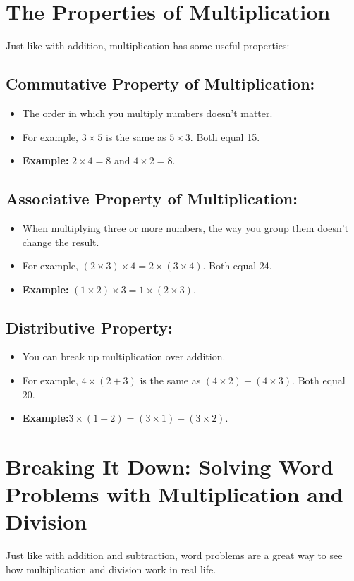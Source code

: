 \section{The Properties of Multiplication}
Just like with addition, multiplication has some useful properties:

\subsection{Commutative Property of Multiplication:}
\begin{itemize}
    \item The order in which you multiply numbers doesn’t matter.
    \item For example, $3 \times 5$ is the same as $5 \times 3$. Both equal 15.
    \item \textbf{Example:} $2 \times 4 = 8$ and $4 \times 2 = 8$.
\end{itemize}

\subsection{Associative Property of Multiplication:}
\begin{itemize}
    \item When multiplying three or more numbers, the way you group them doesn’t change the result.
    \item For example, $(2 \times 3) \times 4 = 2 \times (3 \times 4)$. Both equal 24.
    \item \textbf{Example:} $(1 \times 2) \times 3 = 1 \times (2 \times 3)$.
\end{itemize}

\subsection{Distributive Property:}
\begin{itemize}
    \item You can break up multiplication over addition.
    \item For example, $4 \times (2 + 3)$ is the same as $(4 \times 2) + (4 \times 3)$. Both equal 20.
    \item \textbf{Example:}$ 3 \times (1 + 2) = (3 \times 1) + (3 \times 2)$.
\end{itemize}

\section{Breaking It Down: Solving Word Problems with Multiplication and Division}
Just like with addition and subtraction, word problems are a great way to see how multiplication and division work in real life.

